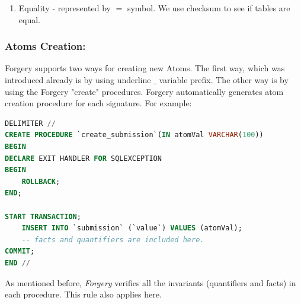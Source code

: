 \documentclass[oneside]{book}
\begin{document}
\begin{enumerate}
\item Equality - represented by $=$ symbol. We use checksum to see if tables are equal.

\end{enumerate}

\subsubsection{Atoms Creation:}

\noindent Forgery supports two ways for creating new Atoms. The first way, which was introduced already is by using underline $\_$ variable prefix. The other way is by using the Forgery "create" procedures. Forgery automatically generates atom creation procedure for each signature. For example:
\begin{lstlisting}[escapechar=@,language=SQL]
DELIMITER //
CREATE PROCEDURE `create_submission`(IN atomVal VARCHAR(100))
BEGIN
DECLARE EXIT HANDLER FOR SQLEXCEPTION
BEGIN
	ROLLBACK;
END;

START TRANSACTION;
	INSERT INTO `submission` (`value`) VALUES (atomVal);
	-- facts and quantifiers are included here.
COMMIT;
END //
\end{lstlisting}

\noindent As mentioned before, \textit{Forgery} verifies all the invariants (quantifiers and facts) in each procedure. This rule also applies here.
\end{document}
